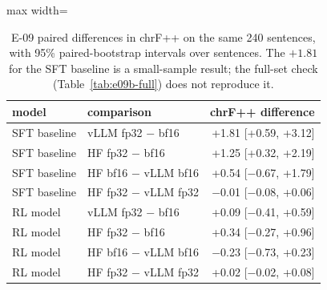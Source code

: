 \begin{table}[htbp]
\centering\footnotesize\setlength{\tabcolsep}{3pt}
\caption{E-09 paired differences in chrF++ on the same 240 sentences, with 95\% paired-bootstrap intervals over sentences. The $+1.81$ for the SFT baseline is a small-sample result; the full-set check (Table~\ref{tab:e09b-full}) does not reproduce it.}\label{tab:e09-diff}
\begin{adjustbox}{max width=\linewidth}\begin{tabular}{@{}llr@{}}
\toprule
model & comparison & chrF++ difference\\
\midrule
SFT baseline & vLLM fp32 $-$ bf16 & +1.81 [+0.59, +3.12] \\
SFT baseline & HF fp32 $-$ bf16 & +1.25 [+0.32, +2.19] \\
SFT baseline & HF bf16 $-$ vLLM bf16 & +0.54 [$-$0.67, +1.79] \\
SFT baseline & HF fp32 $-$ vLLM fp32 & $-$0.01 [$-$0.08, +0.06] \\
RL model & vLLM fp32 $-$ bf16 & +0.09 [$-$0.41, +0.59] \\
RL model & HF fp32 $-$ bf16 & +0.34 [$-$0.27, +0.96] \\
RL model & HF bf16 $-$ vLLM bf16 & $-$0.23 [$-$0.73, +0.23] \\
RL model & HF fp32 $-$ vLLM fp32 & +0.02 [$-$0.02, +0.08] \\
\bottomrule
\end{tabular}\end{adjustbox}
\end{table}
